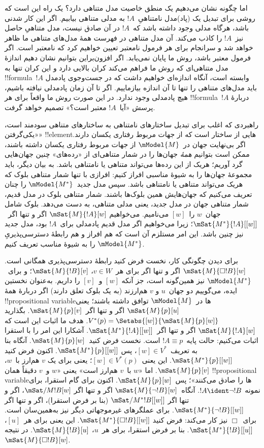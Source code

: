 \documentclass[../../../include/open-logic-section]{subfiles}
\begin{document}
اما چگونه نشان می‌دهیم یک منطق خاصیت مدل متناهی دارد؟ یک راه این است
که روشی برای تبدیل یک (پاد)مدل نامتناهیِ~$!A$ به مدلی متناهی بیابیم.
اگر این کار شدنی باشد، هرگاه مدلی وجود داشته باشد که~$!A$ در آن صادق
نیست، مدل متناهیِ حاصل نیز~$!A$ را کاذب می‌کند. آن مدل متناهی در فهرست
همهٔ مدل‌های متناهی ما ظاهر خواهد شد و سرانجام برای هر فرمول نامعتبر
تعیین خواهیم کرد که نامعتبر است. اگر فرمول معتبر باشد، روش ما پایان
نمی‌یابد. اگر افزون‌براین بتوانیم نشان دهیم اندازهٔ مدل متناهی‌ای که
روش ما فراهم می‌کند کران بالایی دارد و این کران تنها به
!!{formula}~$!A$ وابسته است، آنگاه اندازه‌ای خواهیم داشت که در جست‌وجوی
پادمدل باید مدل‌های متناهی را تنها تا آن اندازه بیازماییم. اگر تا آن
زمان پادمدلی نیافته باشیم، هیچ پادمدلی وجود ندارد. در این صورت روش ما
واقعاً برای هر !!{formula}~$!A$ دربارهٔ پرسش «آیا~$!A$ معتبر است؟»
تصمیم خواهد گرفت.

راهبردی که اغلب برای تبدیل ساختارهای نامتناهی به ساختارهای متناهی سودمند
است، «یکی‌گرفتن» !!{element}هایی از ساختار است که از جهات مربوط رفتاری
یکسان دارند. اگر بی‌نهایت جهان در~$\mModel{M}$ از جهات مربوط رفتاری
یکسان داشته باشند، ممکن است بتوانیم \emph{همهٔ} جهان‌ها را در شمار
متناهی‌ای از «رده‌های» چنین جهان‌هایی گرد آوریم؛ هریک از این رده‌ها
می‌تواند متناهی یا نامتناهی باشد. به بیان دیگر، باید مجموعهٔ جهان‌ها را
به شیوهٔ مناسبی افراز کنیم: افرازی با تنها شمار متناهی بلوک که هریک
می‌تواند متناهی یا نامتناهی باشد. سپس مدل جدید~$\mModel{M^*}$ را چنان
تعریف می‌کنیم که جهان‌هایش همین بلوک‌ها باشند. شمار متناهی بلوک در مدل
قدیم، شمار متناهی جهان در مدل جدید، یعنی مدلی متناهی، به دست می‌دهد.
بلوک شامل جهان~$w$ را~$[w]$ می‌نامیم. می‌خواهیم
$\mSat{M}{!A}[w]$ اگر و تنها اگر~$\mSat{M^*}{!A}[{[w]}]$؛ زیرا
می‌خواهیم اگر مدل قدیم پادمدلی برای~$!A$ بود، مدل جدید نیز چنین باشد.
این امر مستلزم آن است که هم افراز و هم رابطهٔ دسترسی‌پذیریِ
$\mModel{M^*}$ را به شیوهٔ مناسب تعریف کنیم.

برای دیدن چگونگی کار، نخست فرض کنید رابطهٔ دسترسی‌پذیری همگانی است.
$\mSat{M}{\Box !B}[w]$ اگر و تنها اگر برای هر~$v \in W$،
$\mSat{M}{!B}[v]$؛ و برای~$\mModel{M^*}$ نیز همین‌گونه است، جز آنکه
$[w]$ و~$[v]$ را داریم. به‌عنوان نخستین ایده، می‌گوییم دو جهان~$u$ و
$v$ هم‌ارزند (به یک بلوک تعلق دارند) اگر دربارهٔ همهٔ
!!{propositional variable}ها در~$\mModel{M}$ توافق داشته باشند؛ یعنی
$\mSat{M}{p}[u]$ اگر و تنها اگر~$\mSat{M}{p}[v]$. بگذارید
$V^*(p) = \Setabs{[w]}{\mSat{M}{p}[w]}$. هدف ما اثبات این است که
$\mSat{M}{!A}[w]$ اگر و تنها اگر~$\mSat{M^*}{!A}[{[w]}]$. آشکارا
این امر را با استقرا اثبات می‌کنیم: حالت پایه~$!A \equiv p$ است. نخست
فرض کنید~$\mSat{M}{p}[w]$. آنگاه بنا به تعریف~$[w] \in V^*$، پس
$\mSat{M^*}{p}[{[w]}]$. اکنون فرض کنید
$\mSat{M^*}{p}[{[w]}]$. این یعنی~$[w] \in V^*(p)$؛ یعنی برای یک
$v$ هم‌ارز با~$w$، $\mSat{M}{p}[v]$. اما «$w$ با~$v$ هم‌ارز است»
یعنی «$w$ و~$v$ دقیقاً همان !!{propositional variable}ها را صادق
می‌کنند»؛ پس~$\mSat{M}{p}[w]$. اکنون برای گام استقرا، برای نمونه
$!A \ident \lnot !B$. آنگاه~$\mSat{M}{\lnot !B}[w]$ اگر و تنها اگر
$\mSat/{M}{!B}[w]$، اگر و تنها اگر
$\mSat/{M^*}{!B}[{[w]}]$ (بنا بر فرض استقرا)، اگر و تنها اگر
$\mSat{M^*}{\lnot !B}[{[w]}]$. برای عملگرهای غیرموجهاتی دیگر نیز
به‌همین‌سان است. برای~$\Box$ نیز کار می‌کند: فرض کنید
$\mSat{M^*}{\Box !B}[{[w]}]$. این یعنی برای هر~$[u]$،
$\mSat{M^*}{!B}[{[u]}]$. بنا بر فرض استقرا، برای هر~$u$،
$\mSat{M}{!B}[u]$. در نتیجه~$\mSat{M}{\Box !B}[w]$.
\end{document}
